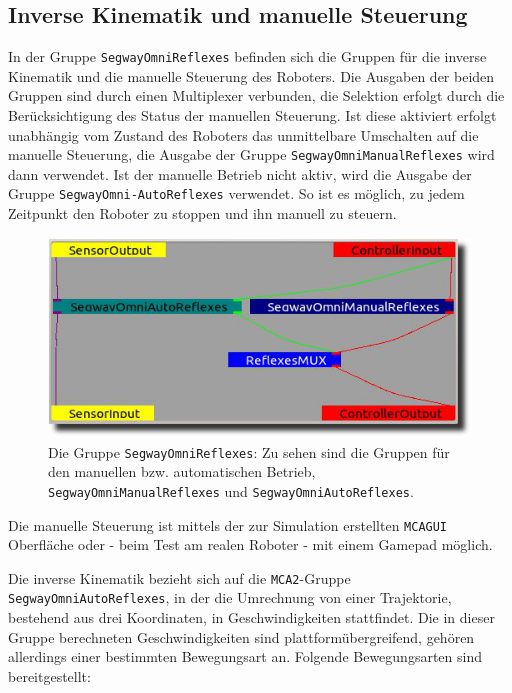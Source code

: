 \subsection{Inverse Kinematik und manuelle Steuerung}
\label{inverse_kinematik_subsec}
\authorsection{\editorjulian}
In der Gruppe \lstinline{SegwayOmniReflexes} befinden sich die Gruppen für die inverse Kinematik und die manuelle Steuerung des Roboters.
 Die Ausgaben der beiden Gruppen sind durch einen Multiplexer verbunden, die Selektion erfolgt durch die Berücksichtigung des Status der manuellen Steuerung.
 Ist diese aktiviert erfolgt unabhängig vom Zustand des Roboters das unmittelbare Umschalten auf die manuelle Steuerung, die Ausgabe der Gruppe
 \lstinline{SegwayOmniManualReflexes} wird dann verwendet. Ist der manuelle Betrieb
 nicht aktiv, wird die Ausgabe der Gruppe
 \lstinline{SegwayOmni-}\lstinline{AutoReflexes} verwendet. So ist es
 möglich, zu jedem Zeitpunkt den Roboter zu stoppen und ihn manuell zu steuern.

\begin{figure}[h]
	\label{fig:bahnplanung_reflexes_gruppe}
	\center
	\includegraphics[scale=0.7]{graphics/BILD-SegwayOmniReflexes.png}
	\caption[Reflexes-Gruppe]{Die Gruppe \lstinline{SegwayOmniReflexes}: Zu sehen sind die Gruppen für den manuellen bzw. automatischen Betrieb, \lstinline{SegwayOmniManualReflexes} und \lstinline{SegwayOmniAutoReflexes}.}
\end{figure}

Die manuelle Steuerung ist mittels der zur Simulation erstellten \lstinline{MCAGUI} Oberfläche oder - beim Test am realen Roboter - mit einem Gamepad möglich.

Die inverse Kinematik bezieht sich auf die \lstinline{MCA2}-Gruppe \lstinline{SegwayOmniAutoReflexes}, in der die Umrechnung von einer Trajektorie, bestehend aus drei Koordinaten, in Geschwindigkeiten stattfindet. Die in dieser Gruppe berechneten Geschwindigkeiten sind plattformübergreifend, gehören allerdings einer bestimmten Bewegungsart an.
Folgende Bewegungsarten sind bereitgestellt:

